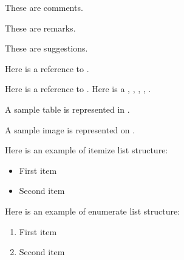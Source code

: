 
\begin{comments}
These are comments.
\end{comments}

\begin{remarks}
These are remarks.
\end{remarks}

\begin{suggestions}
These are suggestions.
\end{suggestions}

{}\newline
Here is a reference to .


Here is a reference to .
Here is a , , , , .


A sample table is represented in .


A sample image is represented on .



Here is an example of itemize list structure:
\begin{itemize}
	\item First item
	\item Second item
\end{itemize}

Here is an example of enumerate list structure:
\begin{enumerate}
	\item First item
	\item Second item
\end{enumerate}

